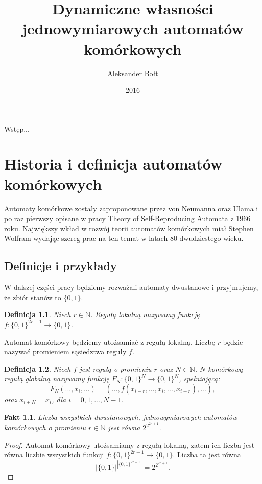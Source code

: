 \documentclass{xmgr}
\author   {Aleksander Bołt}
\title    {Dynamiczne własności jednowymiarowych automatów komórkowych}
\date     {2016}
\newtheorem{definition}{Definicja}
\newtheorem{fact}{Fakt}
\begin{document}
\begin{abstract}
    
\end{abstract}


\maketitle

\introduction

Wstęp...

\chapter{Historia i definicja automatów komórkowych}
Automaty komórkowe zostały zaproponowane przez von Neumanna oraz Ulama i po raz pierwszy opisane w pracy Theory of Self-Reproducing Automata z 1966 roku.
Największy wkład w rozwój teorii automatów komórkowych miał Stephen Wolfram wydając szereg prac na ten temat w latach 80 dwudziestego wieku.

\section{Definicje i przykłady}
W dalszej części pracy będziemy rozważali automaty dwustanowe i przyjmujemy, że zbiór stanów to $\{0,1\}$.
\begin{definition}
 Niech $r \in \mathbb{N}$. Regułą lokalną nazywamy funkcję $f : \{0, 1 \}^{2r+1} \rightarrow \{0,1\}$.
\end{definition}
Automat komórkowy będziemy utożsamiać z regułą lokalną. Liczbę $r$ będzie nazywać promieniem sąsiedztwa reguły $f$.

\begin{definition}
 Niech $f$ jest regułą o promieniu $r$ oraz $N \in \mathbb{N}$. $N$-komórkową regułą globalną nazywamy funkcję 
 $F_{N} : \{0, 1 \}^{N} \rightarrow \{0,1\}^{N}$, spełniającą:
 \[
    F_{N}(...,x_{i},...) = (...,f(x_{i-r},...,x_{i},...,x_{i+r}),...),
 \]
oraz $x_{i+N} = x_{i}$, dla $i =0,1,...,N-1$.
\end{definition}

\begin{fact}
 Liczba wszystkich dwustanowych, jednowymiarowych automatów komórkowych o promieniu $r \in \mathbb{N}$ jest równa $2^{2^{2r+1}}$. 
\end{fact}

\begin{proof}
 Automat komórkowy utożsamiamy z regułą lokalną, zatem ich liczba jest równa liczbie wszystkich funkcji $f :\{0, 1 \}^{2r+1} \rightarrow \{0,1\}$.
 Liczba ta jest równa
 \[
  |\{0,1\}|^{|\{0,1\}^{2r+1}|} = 2^{2^{2r+1}}.
 \]

\end{proof}
\end{document}

